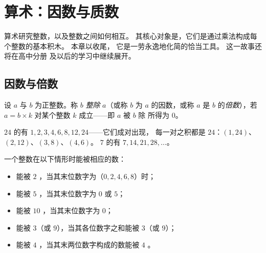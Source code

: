 \chapter{算术：因数与质数}\label{ch:g9:arith}

算术研究整数，以及整数之间如何相互。
其核心对象是，它们是通过乘法构成每个整数的基本积木。
本章以收尾，
它是一劳永逸地化简的恰当工具。
这一故事还将在高中分册
及以后的学习中继续展开。

\section{因数与倍数}

\begin{definition}[因数与倍数]\label{def:g9:arith:divisor}
设 $a$ 与 $b$ 为正整数。称 $b$
\emph{整除} $a$（或称 $b$ 为 $a$ 的因数，或称
$a$ 是 $b$ 的\emph{倍数}），若 $a = b \times
k$ 对某个整数 $k$ 成立——即 $a$ 被 $b$ 除
所得为 $0$。
\end{definition}

\begin{example}
$24$ 的有 $1, 2, 3, 4, 6, 8, 12, 24$——它们成对出现，
每一对之积都是 $24$：$(1,24)$、$(2,12)$、$(3,8)$、$(4,6)$。
$7$ 的有 $7, 14, 21, 28, \dots$。
\end{example}

\begin{proposition}[整除判别法]\label{prop:g9:arith:rules}
一个整数在以下情形时能被相应的数：
\begin{itemize}
  \item 能被 $2$ ，当其末位数字为（$0, 2, 4, 6, 8$）时；
  \item 能被 $5$ ，当其末位数字为 $0$ 或 $5$；
  \item 能被 $10$ ，当其末位数字为 $0$；
  \item 能被 $3$（或 $9$），当其各位数字之和能被
        $3$（或 $9$）；
  \item 能被 $4$ ，当其末两位数字构成的数能被 $4$ 。
\end{itemize}
\end{proposition}
\admitted

